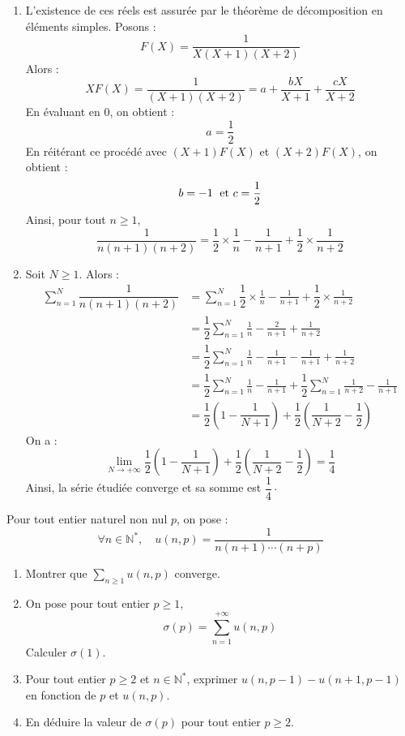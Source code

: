 \documentclass[a4paper,10pt]{report}
\newcommand{\Sum}[2]{\ensuremath{\textstyle{\sum\limits_{#1}^{#2}}}}
\begin{document}
\corr 
\begin{enumerate}
\item L'existence de ces réels est assurée par le théorème de décomposition en éléments simples. Posons :
$$ F(X) = \dfrac{1}{X(X+1)(X+2)}$$
Alors :
$$ XF(X) = \dfrac{1}{(X+1)(X+2)} = a + \dfrac{bX}{X+1} + \dfrac{cX}{X+2}$$
En évaluant en $0$, on obtient :
$$ a = \dfrac{1}{2}$$
En réitérant ce procédé avec $(X+1)F(X)$ et $(X+2)F(X)$, on obtient :
$$ b = -1 \; \hbox{ et } c = \dfrac{1}{2}$$
Ainsi, pour tout $n \geq 1$,
$$  \frac{1}{n(n+1)(n+2)} = \dfrac{1}{2} \times \frac{1}{n} - \frac{1}{n+1}  +\dfrac{1}{2} \times \frac{1}{n+2}$$
\item Soit $N \geq 1$. Alors :
\begin{align*}
\sum_{n=1}^N \dfrac{1}{n(n+1)(n+2)} & = \sum_{n=1}^N  \dfrac{1}{2} \times \frac{1}{n} - \frac{1}{n+1} + \dfrac{1}{2} \times \frac{1}{n+2} \\
& = \dfrac{1}{2} \sum_{n=1}^N  \frac{1}{n} - \frac{2}{n+1}  +\frac{1}{n+2} \\
& = \dfrac{1}{2} \sum_{n=1}^N  \frac{1}{n} - \frac{1}{n+1} - \frac{1}{n+1}  + \frac{1}{n+2} \\
& =  \dfrac{1}{2} \sum_{n=1}^N  \frac{1}{n} - \frac{1}{n+1} +  \dfrac{1}{2} \sum_{n=1}^N   \frac{1}{n+2} - \frac{1}{n+1}  \\
& = \dfrac{1}{2} \left(1 - \dfrac{1}{N+1} \right) + \dfrac{1}{2} \left( \dfrac{1}{N+2} - \dfrac{1}{2} \right)
\end{align*}
On a :
$$ \lim_{N \rightarrow + \infty} \dfrac{1}{2} \left(1 - \dfrac{1}{N+1} \right) + \dfrac{1}{2} \left( \dfrac{1}{N+2} - \dfrac{1}{2} \right) = \dfrac{1}{4}$$
Ainsi, la série étudiée converge et sa somme est $\dfrac{1}{4} \cdot$
\end{enumerate}

\medskip


\begin{Exercice}{} Pour tout entier naturel non nul $p$, on pose :
$$ \forall n \in \mathbb{N}^*, \quad u(n,p) = \frac{1}{n(n+1)\cdots(n+p)}$$

\begin{enumerate}
\item Montrer que $\Sum{n \geq 1}{}  u(n,p)$ converge.
\item On pose pour tout entier $p \geq 1$,
$$ \sigma(p) = \sum_{n=1}^{+ \infty} u(n,p)$$
Calculer $\sigma(1)$.
\item Pour tout entier $p \geq 2$ et $n \in \mathbb{N}^*$, exprimer $u(n,p-1)-u(n+1,p-1)$ en fonction de $p$ et $u(n,p)$.
\item En déduire la valeur de $\sigma(p)$ pour tout entier $p \geq 2$.
\end{enumerate}
\end{Exercice}
\end{document}
